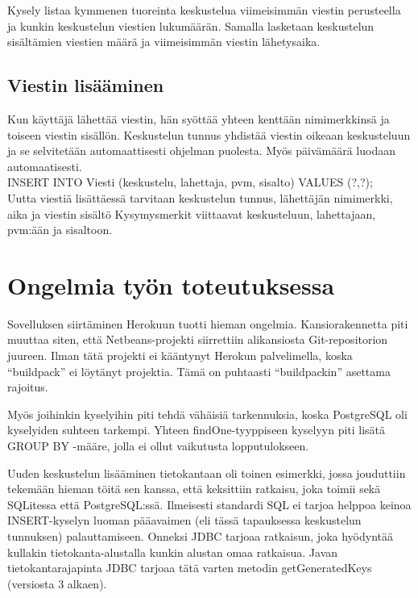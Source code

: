 \documentclass[titlepage]{article}
\begin{document}
\noindent Kysely listaa kymmenen tuoreinta keskustelua viimeisimmän viestin perusteella ja kunkin keskustelun viestien lukumäärän. Samalla lasketaan keskustelun sisältämien viestien määrä ja viimeisimmän viestin lähetysaika. 


\subsection*{Viestin lisääminen}

\noindent Kun käyttäjä lähettää viestin, hän syöttää yhteen kenttään nimimerkkinsä ja toiseen viestin sisällön. Keskustelun tunnus yhdistää viestin oikeaan keskusteluun ja se selvitetään automaattisesti ohjelman puolesta. Myös päivämäärä luodaan automaatisesti.\\

\noindent INSERT INTO Viesti (keskustelu, lahettaja, pvm, sisalto) VALUES (?,?); \\

\noindent Uutta viestiä lisättäessä tarvitaan keskustelun tunnus, lähettäjän nimimerkki, aika ja viestin sisältö Kysymysmerkit viittaavat keskusteluun, lahettajaan, pvm:ään ja sisaltoon.

\section*{Ongelmia työn toteutuksessa}

\noindent Sovelluksen siirtäminen Herokuun tuotti hieman ongelmia. Kansiorakennetta piti muuttaa siten, että Netbeans-projekti siirrettiin alikansiosta Git-repositorion juureen. Ilman tätä projekti ei kääntynyt Herokun palvelimella, koska “buildpack” ei löytänyt projektia. Tämä on puhtaasti “buildpackin” asettama rajoitus.

Myös joihinkin kyselyihin piti tehdä vähäisiä tarkennuksia, koska PostgreSQL oli kyselyiden suhteen tarkempi. Yhteen findOne-tyyppiseen kyselyyn piti lisätä GROUP BY -määre, jolla ei ollut vaikutusta lopputulokseen.

Uuden keskustelun lisääminen tietokantaan oli toinen esimerkki, jossa jouduttiin tekemään hieman töitä sen kanssa, että keksittiin ratkaisu, joka toimii sekä SQLitessa että PostgreSQL:ssä. Ilmeisesti standardi SQL ei tarjoa helppoa keinoa INSERT-kyselyn luoman pääavaimen (eli tässä tapauksessa keskustelun tunnuksen) palauttamiseen. Onneksi JDBC tarjoaa ratkaisun, joka hyödyntää kullakin tietokanta-alustalla kunkin alustan omaa ratkaisua. Javan tietokantarajapinta JDBC tarjoaa tätä varten metodin getGeneratedKeys (versiosta 3 alkaen).
\end{document}
